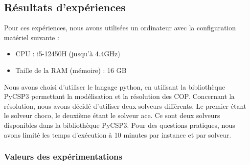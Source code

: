 \documentclass[a4paper, 10pt]{article}
\begin{document}
    \subsection{Résultats d'expériences}

      Pour ces expériences, nous avons utilisées un ordinateur avec la configuration matériel suivante :
      \begin{itemize}
        \item CPU : i5-12450H  (jusqu'à 4.4GHz)
        \item Taille de la RAM (mémoire) : 16 GB
      \end{itemize}

      Nous avons choisi d'utiliser le langage python, en utilisant la bibliothèque PyCSP3 permettant la modélisation et la résolution des COP. Concernant la résolution, nous avons décidé d'utiliser deux solveurs différents. Le premier étant le solveur choco, le deuxième étant le solveur ace. Ce sont deux solveurs disponibles dans la bibliothèque PyCSP3. Pour des questions pratiques, nous avons limité les temps d'exécution à 10 minutes par instance et par solveur.

      \subsubsection{Valeurs des expérimentations}
\end{document}
